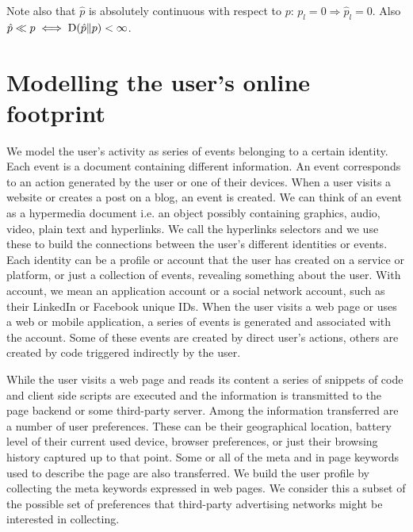 Note also that $\hat{p}$ is absolutely continuous with respect to $p$: $p_l = 0 \Rightarrow \hat{p}_l = 0$. Also $\hat{p} \ll p \iff  \textnormal{D}(\hat{p} \| p) < \infty$.

\section{Modelling the user's online footprint}
\noindent
We model the user's activity as series of events belonging to a certain identity. Each event is a document containing different information. An event corresponds to an action generated by the user or one of their devices. When a user visits a website or creates a post on a blog, an event is created. We can think of an event as a hypermedia document i.e. an object possibly containing graphics, audio, video, plain text and hyperlinks. We call the hyperlinks selectors and we use these to build the connections between the user's different identities or events. Each identity can be a profile or account that the user has created on a service or platform, or just a collection of events, revealing something about the user. With account, we mean an application account or a social network account, such as their LinkedIn or Facebook unique IDs. When the user visits a web page or uses a web or mobile application, a series of events is generated and associated with the account. Some of these events are created by direct user's actions, others are created by code triggered indirectly by the user.

While the user visits a web page and reads its content a series of snippets of code and client side scripts are executed and the information is transmitted to the page backend or some third-party server. Among the information transferred are a number of user preferences. These can be their geographical location, battery level of their current used device, browser preferences, or just their browsing history captured up to that point. Some or all of the meta and in page keywords used to describe the page are also transferred. We build the user profile by collecting the meta keywords expressed in web pages. We consider this a subset of the possible set of preferences that third-party advertising networks might be interested in collecting.

